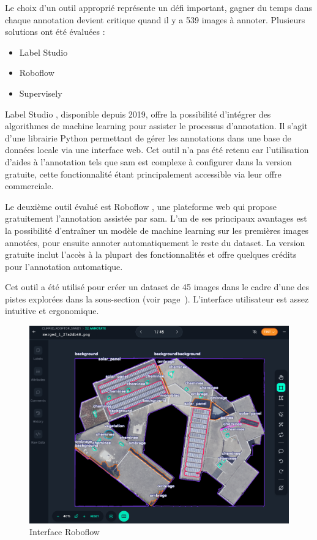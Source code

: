 Le choix d'un outil approprié représente un défi important, gagner du temps dans chaque annotation devient critique quand il y a 539 images à annoter. Plusieurs solutions ont été évaluées :
\begin{itemize}
    \item Label Studio \cite{label_studio_open_nodate}
    \item Roboflow \cite{roboflow_roboflow_nodate}
    \item Supervisely \cite{supervisely_supervisely_nodate}
\end{itemize}

Label Studio \cite{label_studio_open_nodate}, disponible depuis 2019, offre la possibilité d'intégrer des algorithmes de machine learning pour assister le processus d'annotation. Il s'agit d'une librairie Python permettant de gérer les annotations dans une base de données locale via une interface web. Cet outil n'a pas été retenu car l'utilisation d'aides à l'annotation tels que \acrshort{sam} \cite{label_studio_label_nodate} est complexe à configurer dans la version gratuite, cette fonctionnalité étant principalement accessible via leur offre commerciale.

Le deuxième outil évalué est Roboflow \cite{roboflow_roboflow_nodate}, une plateforme web qui propose gratuitement l'annotation assistée par \acrshort{sam}. L'un de ses principaux avantages est la possibilité d'entraîner un modèle de machine learning sur les premières images annotées, pour ensuite annoter automatiquement le reste du dataset. La version gratuite inclut l'accès à la plupart des fonctionnalités et offre quelques crédits pour l'annotation automatique.

Cet outil a été utilisé pour créer un dataset de 45 images dans le cadre d'une des pistes explorées dans la sous-section \textit{} (voir page~\pageref{subsubsec:fine_tuning_sam}). L'interface utilisateur est assez intuitive et ergonomique.

\begin{figure}[H]
    \centering
    \includegraphics[width=1\linewidth]{02-main//figures//ch3/ch3_labellisation_01_outils_01_robolfow.png}
    \caption{Interface Roboflow}
    \label{fig:ch3_labellisation_01_outils_01_robolfow}
\end{figure}

